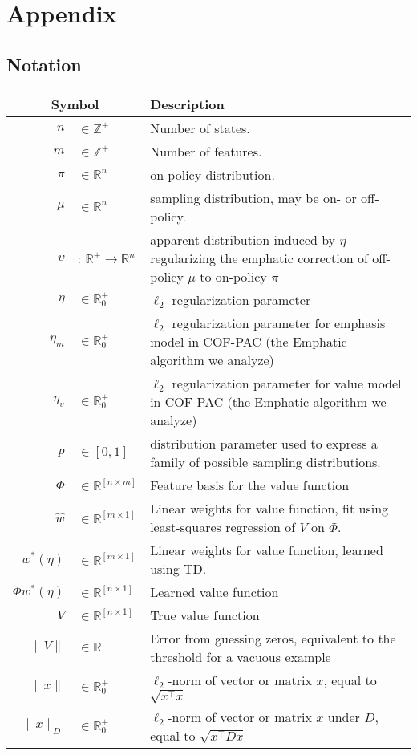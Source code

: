 
\section{Appendix}

\subsection{Notation}

\begin{tabular}{rl p{4in}}\hline\hline
  \multicolumn{2}{c}{Symbol} & Description
  \\\hline
  $n$                        & $\in\mathbb Z^+$ & Number of states.
  \\  $m$ & $\in\mathbb Z^+$ & Number of features.
  \\  $\pi$ & $\in\mathbb R^{n}$ & on-policy distribution.
  \\  $\mu$ & $\in\mathbb R^{n}$ & sampling distribution, may be on- or off-policy.
  \\  $\upsilon$ & : $\mathbb R^+ \to \mathbb R^{n}$ & apparent distribution induced by $\eta$-regularizing the emphatic correction of off-policy $\mu$ to on-policy $\pi$
  \\  $\eta$ & $\in \mathbb R^+_0$ & $\ell_2$ regularization parameter
  \\  $\eta_m$ & $\in \mathbb R^+_0$ & $\ell_2$ regularization parameter for emphasis model in COF-PAC (the Emphatic algorithm we analyze)
  \\  $\eta_v$ & $\in \mathbb R^+_0$ & $\ell_2$ regularization parameter for value model in COF-PAC (the Emphatic algorithm we analyze)
  \\  $p$ & $\in[0, 1]$ & distribution parameter used to express a family of possible sampling distributions.
  \\  $\Phi$ & $\in \mathbb R^{[n\times m]}$ & Feature basis for the value function
  \\  $\hat w$ & $\in \mathbb R^{[m\times 1]}$ & Linear weights for value function, fit using least-squares regression of $V$ on $\Phi$.
  \\  $w^*(\eta)$ & $\in \mathbb R^{[m\times 1]}$ & Linear weights for value function, learned using TD.
  \\  $\Phi w^*(\eta)$ & $\in \mathbb R^{[n\times 1]}$ & Learned value function
  \\  $V$ & $\in \mathbb R^{[n\times 1]}$ & True value function
  \\  $\|V\|$ & $\in \mathbb R$ & Error from guessing zeros, equivalent to the threshold for a vacuous example
  \\  $\|x\|$ & $\in\mathbb R^+_0$ & $\ell_2$-norm of vector or matrix $x$, equal to $\sqrt{x^\top x}$
  \\  $\|x\|_D$ & $\in\mathbb R^+_0$ & $\ell_2$-norm of vector or matrix $x$ under $D$, equal to $\sqrt{x^\top D x}$
  \\ \hline\hline
\end{tabular}


